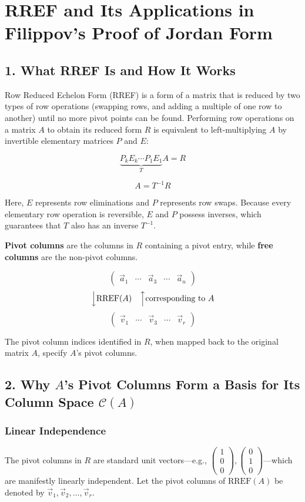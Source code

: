 \documentclass[12pt, a4paper]{article}
\begin{document}
\vspace{2em}

\section*{\color{primary} RREF and Its Applications in Filippov's Proof of Jordan Form}

\subsection*{\color{accent} 1. What RREF Is and How It Works}

Row Reduced Echelon Form (RREF) is a form of a matrix that is reduced by two types of row operations (swapping rows, and adding a multiple of one row to another) until no more pivot points can be found. Performing row operations on a matrix $A$ to obtain its reduced form $R$ is equivalent to left-multiplying $A$ by invertible elementary matrices $P$ and $E$:

\[
\underbrace{P_k E_k \cdots P_1 E_1}_{T} A = R
\]

\[
A = T^{-1} R
\]

Here, $E$ represents row eliminations and $P$ represents row swaps. Because every elementary row operation is reversible, $E$ and $P$ possess inverses, which guarantees that $T$ also has an inverse $T^{-1}$.

\textbf{Pivot columns} are the columns in $R$ containing a pivot entry, while \textbf{free columns} are the non-pivot columns.

\[
\begin{pmatrix} \vec{a}_1 & \cdots & \vec{a}_3 & \cdots & \vec{a}_n \end{pmatrix}
\]
\[
\Big\downarrow \text{RREF}(A) \quad \Big\uparrow \text{corresponding to } A
\]
\[
\begin{pmatrix} \vec{v}_1 & \cdots & \vec{v}_3 & \cdots & \vec{v}_r \end{pmatrix}
\]

The pivot column indices identified in $R$, when mapped back to the original matrix $A$, specify $A$'s pivot columns.

\subsection*{\color{accent} 2. Why $A$'s Pivot Columns Form a Basis for Its Column Space $\mathcal{C}(A)$}

\subsubsection*{Linear Independence}
The pivot columns in $R$ are standard unit vectors—e.g., $\begin{pmatrix} 1 \\ 0 \\ 0 \end{pmatrix}, \begin{pmatrix} 0 \\ 1 \\ 0 \end{pmatrix}$—which are manifestly linearly independent. Let the pivot columns of $\text{RREF}(A)$ be denoted by $\vec{v}_1, \vec{v}_2, \dots, \vec{v}_r$.
\end{document}
